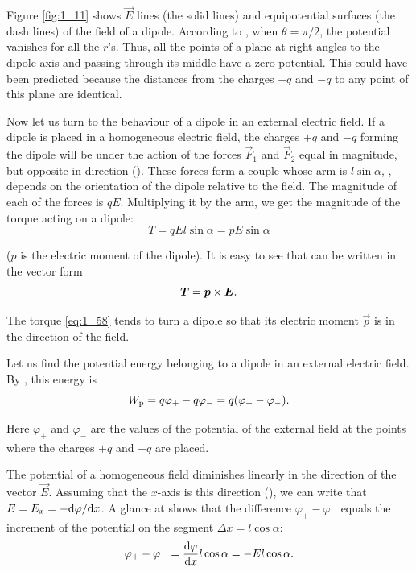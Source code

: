 Figure \ref{fig:1_11} shows $\vec{E}$ lines (the solid lines) and equipotential surfaces (the dash lines) of the field of a dipole. According to , when $\theta=\pi/2$, the potential vanishes for all the $r$'s. Thus, all the points of a plane at right angles to the dipole axis and passing through its middle have a zero potential. This could have been predicted because the distances from the charges $+q$ and $-q$ to any point of this plane are identical.

Now let us turn to the behaviour of a dipole in an external electric field. If a dipole is placed in a homogeneous electric field, the charges $+q$ and $-q$ forming the dipole will be under the action of the forces $\vec{F}_1$ and $\vec{F}_2$ equal in magnitude, but opposite in direction (). These forces form a couple whose arm is $l\sin\alpha$, \ie, depends on the orientation of the dipole relative to the field. The magnitude of each of the forces is $qE$. Multiplying it by the arm, we get the magnitude of the torque acting on a dipole:
\begin{equation}\label{eq:1_57}
	T = q E l \sin\alpha = p E \sin\alpha
\end{equation}

\noindent
($p$ is the electric moment of the dipole). It is easy to see that  can be written in the vector form
\begin{equation}\label{eq:1_58}
	\boldsymbol{T} = \boldsymbol{p}\times\boldsymbol{E}.
\end{equation}

\noindent
The torque \eqref{eq:1_58} tends to turn a dipole so that its electric moment $\vec{p}$ is in the direction of the field.

Let us find the potential energy belonging to a dipole in an external electric field. By , this energy is
\begin{equation}\label{eq:1_59}
	W_{\text{p}} = q\varphi_+ - q\varphi_- = q(\varphi_+ - \varphi_-).
\end{equation}

\noindent
Here $\varphi_+$ and $\varphi_-$ are the values of the potential of the external field at the points where the charges $+q$ and $-q$ are placed.

The potential of a homogeneous field diminishes linearly in the direction of the vector $\vec{E}$. Assuming that the $x$-axis is this direction (), we can write that $E=E_x=-\mathrm{d}\varphi/\mathrm{d} x$. A glance at  shows that the difference $\varphi_+-\varphi_-$ equals the increment of the potential on the segment $\Delta{x}=l\cos\alpha$:
\begin{equation*}
	\varphi_+ - \varphi_- = \dfrac{\mathrm{d}\varphi}{\mathrm{d} x} l\cos\alpha = -El\cos\alpha.
\end{equation*}

